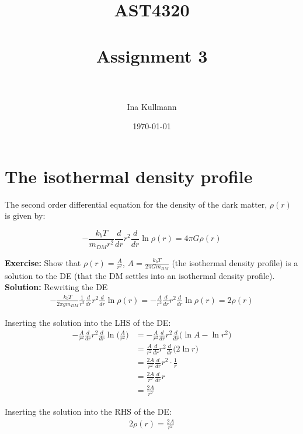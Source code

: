 \documentclass[paper=a4, fontsize=11pt]{scrartcl} %
\title{	
\normalfont \normalsize 
\textsc{AST4320} \\ [25pt] %
\horrule{0.5pt} \\[0.4cm] %
\huge Assignment 3 \\ %
\horrule{2pt} \\[0.5cm] %
}
\author{Ina Kullmann} %
\date{\normalsize\today} %
\numberwithin{figure}{section} %
\numberwithin{table}{section} %
\begin{document}
\maketitle %


\section{The isothermal density profile}

The second order differential equation for the density of the dark matter, $\rho(r)$ is given by:

\begin{equation}
-\frac{k_bT}{m_{DM}r^2} \frac{d}{dr}r^2 \frac{d}{dr} \ln \rho(r) = 4\pi G\rho(r)
\label{eq:DE}
\end{equation}

\textbf{Exercise:}  Show that $\rho(r) = \frac{A}{r^2}$, $A=\frac{k_bT}{2\pi Gm_{DM}}$ (the isothermal density profile) is a solution to the DE (that the DM settles into an isothermal density profile).\\

\textbf{Solution:} Rewriting the DE
\begin{align*}
-\frac{k_bT}{2\pi gm_{DM}} \frac{1}{r^2} \frac{d}{dr}r^2 \frac{d}{dr} \ln \rho(r) = -\frac{A}{r^2} \frac{d}{dr}r^2 \frac{d}{dr} \ln \rho(r) = 2\rho(r)
\end{align*}

Inserting the solution into the LHS of the DE:
\begin{align*}
-\frac{A}{r^2} \frac{d}{dr}r^2 \frac{d}{dr} \ln \Bigg(\frac{A}{r^2} \Bigg) &=  -\frac{A}{r^2} \frac{d}{dr}r^2 \frac{d}{dr} \Bigg( \ln A - \ln r^2 \Bigg) \\
&= \frac{A}{r^2} \frac{d}{dr}r^2 \frac{d}{dr} \Bigg( 2 \ln r \Bigg) \\
&= \frac{2A}{r^2} \frac{d}{dr}r^2 \cdot \frac{1}{r} \\
&= \frac{2A}{r^2} \frac{d}{dr}r \\
&= \frac{2A}{r^2} 
\end{align*}

Inserting the solution into the RHS of the DE:
\begin{align*}
2\rho(r) = \frac{2A}{r^2}
\end{align*}
\end{document}
